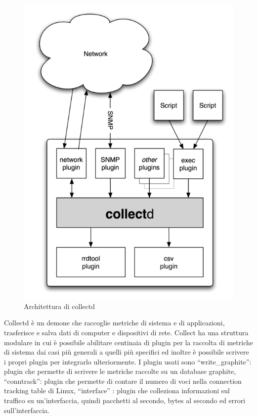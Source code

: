 \begin{figure}[h]
    \label{fig:collectd}
    \includegraphics[width=\hsize]{images/my_work/collectd.png}
    \caption{Architettura di collectd}
    \centering
\end{figure}

Collectd è un demone che raccoglie metriche di sistema e di applicazioni, trasferisce e salva dati di computer e dispositivi di rete. Collect ha una struttura modulare in cui è possibile abilitare centinaia di plugin per la raccolta di metriche di sistema dai casi più generali a quelli più specifici ed inoltre è possibile scrivere i propri plugin per integrarlo ulteriormente. I plugin usati sono ``write\_graphite'': plugin che permette di scrivere le metriche raccolte su un database graphite, ``conntrack'': plugin che permette di contare il numero di voci nella connection tracking table di Linux, ``interface'' : plugin che colleziona informazioni sul traffico su un'interfaccia, quindi pacchetti al secondo, bytes al secondo ed errori sull'interfaccia. 


